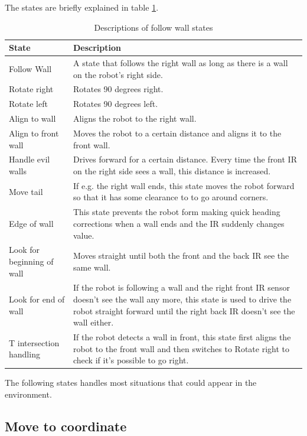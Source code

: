The states are briefly explained in table \ref{tab:followWallStates}. 
\begin{table}[h]
\centering
  \caption{Descriptions of follow wall states}
  \begin{tabular}{l|p{10cm}}
    \textbf{State} & \textbf{Description} \\ \hline
    Follow Wall & A state that follows the right wall as long as there is a wall on the robot’s right side. \\ \hline
    Rotate right & Rotates 90 degrees right. \\ \hline
    Rotate left & Rotates 90 degrees left. \\ \hline
    Align to wall & Aligns the robot to the right wall. \\ \hline
    Align to front wall & Moves the robot to a certain distance and aligns it to the front wall. \\ \hline
    Handle evil walls & Drives forward for a certain distance. Every time the front IR on the right side sees a wall, this distance is increased. \\ \hline
    Move tail & If e.g. the right wall ends, this state moves the robot forward so that it has some clearance to to go around corners. \\ \hline
    Edge of wall & This state prevents the robot form making quick heading corrections when a wall ends and the IR suddenly changes value. \\ \hline
    Look for beginning of wall & Moves straight until both the front and the back IR see the same wall.  \\ \hline
    Look for end of wall & If the robot is following a wall and the right front IR sensor doesn’t see the wall any more, this state is used to drive the robot straight forward until the right back IR doesn’t see the wall either. \\ \hline
    T intersection handling & If the robot detects a wall in front, this state first aligns the robot to the front wall and then switches to Rotate right to check if it’s possible to go right. \\ 
    \hline
  \end{tabular}
\normalsize
\label{tab:followWallStates}
\end{table}

The following states handles most situations that could appear in the environment.

\subsection{Move to coordinate}

